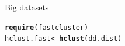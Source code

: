 \documentclass[10pt,xcolor=dvipsnames]{beamer}\usepackage[]{graphicx}\usepackage[]{color}
\makeatletter
\newcommand{\hlstd}[1]{\textcolor[rgb]{0.345,0.345,0.345}{#1}}%
\newcommand{\hlkwb}[1]{\textcolor[rgb]{0.69,0.353,0.396}{#1}}%
\newcommand{\hlkwd}[1]{\textcolor[rgb]{0.737,0.353,0.396}{\textbf{#1}}}%
\newenvironment{kframe}{%
 \def\at@end@of@kframe{}%
 \ifinner\ifhmode%
  \def\at@end@of@kframe{\end{minipage}}%
  \begin{minipage}{\columnwidth}%
 \fi\fi%
 \def\FrameCommand##1{\hskip\@totalleftmargin \hskip-\fboxsep
 \colorbox{shadecolor}{##1}\hskip-\fboxsep
     \hskip-\linewidth \hskip-\@totalleftmargin \hskip\columnwidth}%
 \MakeFramed {\advance\hsize-\width
   \@totalleftmargin\z@ \linewidth\hsize
   \@setminipage}}%
 {\par\unskip\endMakeFramed%
 \at@end@of@kframe}
\newenvironment{knitrout}{}{} %
\makeatother
\begin{document}
\begin{frame}{Big datasets}
\begin{knitrout}\footnotesize
{}\color{fgcolor}\begin{kframe}
\begin{alltt}
\hlkwd{require}\hlstd{(fastcluster)}
\hlstd{hclust.fast} \hlkwb{<-} \hlkwd{hclust}\hlstd{(dd.dist)}
\end{alltt}
\end{kframe}
\end{knitrout}
\end{frame}
\end{document}
